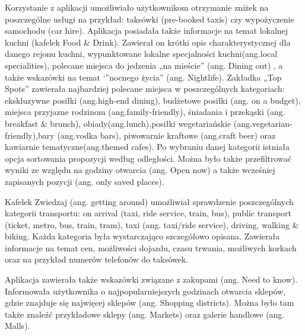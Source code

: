 \documentclass[10pt,twoside,a4paper]{report}
\begin{document}
\par Korzystanie z aplikacji umożliwiało użytkownikom otrzymanie zniżek na poszczególne usługi na przykład: taksówki (pre-booked taxis) czy wypożyczenie samochodu (car hire).
Aplikacja posiadała także informacje na temat lokalnej kuchni (kafelek Food \& Drink). Zawierał on krótki opis charakterystycznej dla danego rejonu kuchni, wypunktowane lokalne specjalności kuchni(ang.local specialities), polecane miejsca do jedzenia „na mieście” (ang. Dining out) , a także wskazówki na temat ‘”nocnego życia” (ang. Nightlife). Zakładka „Top Spots” zawierała najbardziej polecane miejsca w poszczególnych kategoriach: ekskluzywne posiłki (ang.high-end dining), budżetowe posiłki (ang. on a budget), miejsca przyjazne rodzinom (ang.family-friendly), śniadania i przekąski (ang. breakfast \& brunch), obiady(ang.lunch),posiłki wegetariańskie (ang.vegetarian-friendly),bary (ang.vodka bars), piwowarnie kraftowe (ang.craft beer) oraz kawiarnie tematyczne(ang.themed cafes). Po wybraniu danej kategorii istniała opcja sortowania propozycji według odległości. Można było także przefiltrować wyniki ze względu na godziny otwarcia (ang. Open now) a także wcześniej zapisanych pozycji (ang. only saved places).
\par Kafelek Zwiedzaj (ang. getting around) umożliwiał sprawdzenie poszczególnych kategorii transportu: on arrival (taxi, ride service, train, bus), public transport (ticket, metro, bus, train, tram), taxi (ang. taxi/ride service), driving, walking \& biking. Każda kategoria była wystarczająco szczegółowo opisana. Zawierała informacje na temat cen, możliwości dojazdu, czasu trwania, możliwych korkach oraz na przykład numerów telefonów do taksówek.
\par Aplikacja zawierała także wskazówki związane z zakupami (ang. Need to know). Informowała użytkownika o najpopularniejszych godzinach otwarcia sklepów, gdzie znajduje się najwięcej sklepów (ang. Shopping districts). Można było tam także znaleźć przykładowe sklepy (ang. Markets) oraz galerie handlowe (ang. Malls).
 
\end{document}
